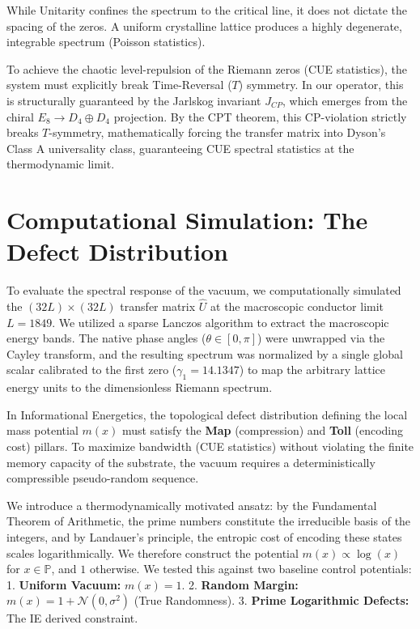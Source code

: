 \documentclass[11pt,aps,prd,twocolumn,nofootinbib,superscriptaddress]{revtex4-2}
\begin{document}
While Unitarity confines the spectrum to the critical line, it does not dictate the spacing of the zeros. A uniform crystalline lattice produces a highly degenerate, integrable spectrum (Poisson statistics). 

To achieve the chaotic level-repulsion of the Riemann zeros (CUE statistics), the system must explicitly break Time-Reversal ($T$) symmetry. In our operator, this is structurally guaranteed by the Jarlskog invariant $J_{CP}$, which emerges from the chiral $E_8 \to D_4 \oplus D_4$ projection. By the CPT theorem, this CP-violation strictly breaks $T$-symmetry, mathematically forcing the transfer matrix into Dyson's Class A universality class, guaranteeing CUE spectral statistics at the thermodynamic limit.

\section{Computational Simulation: The Defect Distribution}

To evaluate the spectral response of the vacuum, we computationally simulated the $(32L) \times (32L)$ transfer matrix $\hat{U}$ at the macroscopic conductor limit $L = 1849$. We utilized a sparse Lanczos algorithm to extract the macroscopic energy bands. The native phase angles ($\theta \in [0, \pi]$) were unwrapped via the Cayley transform, and the resulting spectrum was normalized by a single global scalar calibrated to the first zero ($\gamma_1 = 14.1347$) to map the arbitrary lattice energy units to the dimensionless Riemann spectrum.

In Informational Energetics, the topological defect distribution defining the local mass potential $m(x)$ must satisfy the \textbf{Map} (compression) and \textbf{Toll} (encoding cost) pillars. To maximize bandwidth (CUE statistics) without violating the finite memory capacity of the substrate, the vacuum requires a deterministically compressible pseudo-random sequence. 

We introduce a thermodynamically motivated ansatz: by the Fundamental Theorem of Arithmetic, the prime numbers constitute the irreducible basis of the integers, and by Landauer's principle, the entropic cost of encoding these states scales logarithmically. We therefore construct the potential $m(x) \propto \log(x)$ for $x \in \mathbb{P}$, and $1$ otherwise. We tested this against two baseline control potentials:
1. \textbf{Uniform Vacuum:} $m(x) = 1$.
2. \textbf{Random Margin:} $m(x) = 1 + \mathcal{N}(0, \sigma^2)$ (True Randomness).
3. \textbf{Prime Logarithmic Defects:} The IE derived constraint.
\end{document}

